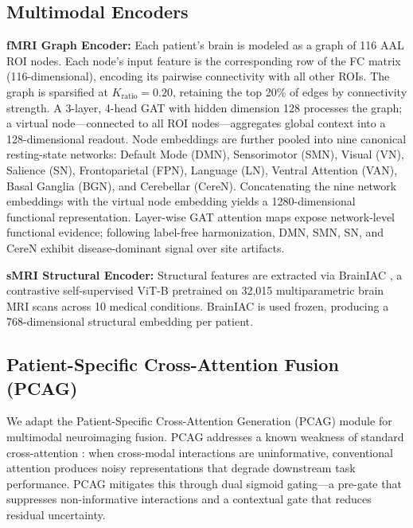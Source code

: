 \documentclass[conference]{IEEEtran}
\begin{document}
\subsection{Multimodal Encoders}
\textbf{fMRI Graph Encoder:} Each patient's brain is modeled as a graph of 116 AAL ROI nodes. Each node's input feature is the corresponding row of the FC matrix (116-dimensional), encoding its pairwise connectivity with all other ROIs. The graph is sparsified at $K_{\text{ratio}} = 0.20$, retaining the top 20\% of edges by connectivity strength. A 3-layer, 4-head GAT \cite{velickovic2018gat} with hidden dimension 128 processes the graph; a virtual node---connected to all ROI nodes---aggregates global context into a 128-dimensional readout. Node embeddings are further pooled into nine canonical resting-state networks: Default Mode (DMN), Sensorimotor (SMN), Visual (VN), Salience (SN), Frontoparietal (FPN), Language (LN), Ventral Attention (VAN), Basal Ganglia (BGN), and Cerebellar (CereN). Concatenating the nine network embeddings with the virtual node embedding yields a 1280-dimensional functional representation. Layer-wise GAT attention maps expose network-level functional evidence; following label-free harmonization, DMN, SMN, SN, and CereN exhibit disease-dominant signal over site artifacts.

\textbf{sMRI Structural Encoder:} Structural features are extracted via BrainIAC \cite{tak2026brainiac}, a contrastive self-supervised ViT-B pretrained on 32,015 multiparametric brain MRI scans across 10 medical conditions. BrainIAC is used frozen, producing a 768-dimensional structural embedding per patient.

\subsection{Patient-Specific Cross-Attention Fusion (PCAG)}
\label{sec:pcag}
We adapt the Patient-Specific Cross-Attention Generation (PCAG) module \cite{zhang2024pcag} for multimodal neuroimaging fusion. PCAG addresses a known weakness of standard cross-attention \cite{vaswani2017attention}: when cross-modal interactions are uninformative, conventional attention produces noisy representations that degrade downstream task performance. PCAG mitigates this through dual sigmoid gating---a pre-gate that suppresses non-informative interactions and a contextual gate that reduces residual uncertainty.
\end{document}
